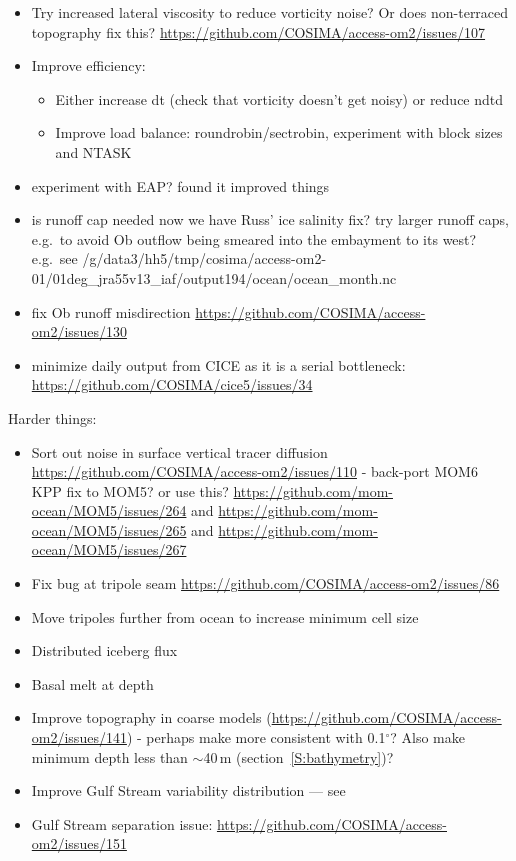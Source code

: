 \documentclass[11pt, a4paper]{article}
\begin{document}
\begin{itemize}
\item Try increased lateral viscosity to reduce vorticity noise? Or does non-terraced topography fix this? \url{https://github.com/COSIMA/access-om2/issues/107}
\item Improve efficiency:
\begin{itemize}
\item Either increase dt (check that vorticity doesn't get noisy) or reduce ndtd
\item Improve load balance: roundrobin/sectrobin, experiment with block sizes and NTASK
\end{itemize}
\item experiment with EAP? \citet{Naughten2018a} found it improved things
\item is runoff cap needed now we have Russ' ice salinity fix? try larger runoff caps, e.g.\ to avoid Ob outflow being smeared into the embayment to its west? e.g.\ see /g/data3/hh5/tmp/cosima/access-om2-01/01deg_jra55v13_iaf/output194/ocean/ocean_month.nc
\item fix Ob runoff misdirection \url{https://github.com/COSIMA/access-om2/issues/130}
\item minimize daily output from CICE as it is a serial bottleneck: \url{https://github.com/COSIMA/cice5/issues/34} 
\end{itemize}

Harder things:
\begin{itemize}
\item Sort out noise in surface vertical tracer diffusion \url{https://github.com/COSIMA/access-om2/issues/110} - back-port MOM6 KPP fix to MOM5? or use this? \url{https://github.com/mom-ocean/MOM5/issues/264} and \url{https://github.com/mom-ocean/MOM5/issues/265} and \url{https://github.com/mom-ocean/MOM5/issues/267}
\item Fix bug at tripole seam \url{https://github.com/COSIMA/access-om2/issues/86}
\item Move tripoles further from ocean to increase minimum cell size
\item Distributed iceberg flux
\item Basal melt at depth
\item Improve topography in coarse models (\url{https://github.com/COSIMA/access-om2/issues/141}) - perhaps make more consistent with 0.1$^\circ$? Also make minimum depth less than $\sim$40\,m (section~\ref{S:bathymetry})?
\item Improve Gulf Stream variability distribution --- see \citet{RenaultMolemakerGulaMassonMcWilliams2016a, RenaultMarchesielloMassonMcWilliams2019a, RenaultMassonOerderJullienColas2019a}
\item Gulf Stream separation issue: \url{https://github.com/COSIMA/access-om2/issues/151}
\end{itemize}
 
\end{document}
